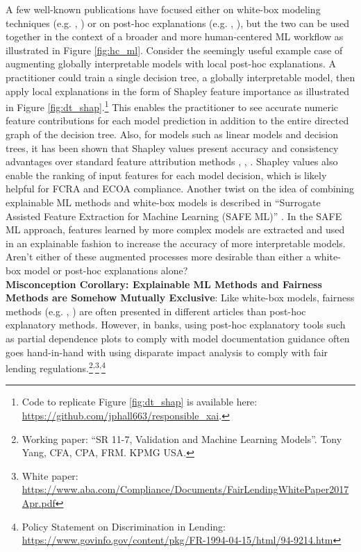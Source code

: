 \documentclass[fleqn]{article}
\begin{document}
A few well-known publications have focused either on white-box modeling techniques (e.g. \cite{slim}, \cite{sbrl}) or on post-hoc explanations (e.g.  \cite{shapley}, \cite{lime}), but the two can be used together in the context of a broader and more human-centered ML workflow as illustrated in Figure \ref{fig:hc_ml}. Consider the seemingly useful example case of augmenting globally interpretable models with local post-hoc explanations. A practitioner could train a single decision tree, a globally interpretable model, then apply local explanations in the form of Shapley feature importance as illustrated in Figure \ref{fig:dt_shap}.\footnote{Code to replicate Figure \ref{fig:dt_shap} is available here: \url{https://github.com/jphall663/responsible_xai}.} This enables the practitioner to see accurate numeric feature contributions for each model prediction in addition to the entire directed graph of the decision tree. Also, for models such as linear models and decision trees, it has been shown that Shapley values present accuracy and consistency advantages over standard feature attribution methods \cite{lipovetsky2001analysis}, \cite{tree_shap}, \cite{shapley}. Shapley values also enable the ranking of input features for each model decision, which is likely helpful for FCRA and ECOA compliance. Another twist on the idea of combining explainable ML methods and white-box models is described in ``Surrogate Assisted Feature Extraction for Machine Learning (SAFE ML)'' \cite{gosiewska2019safe}. In the SAFE ML approach, features learned by more complex models are extracted and used in an explainable fashion to increase the accuracy of more interpretable models. Aren't either of these augmented processes more desirable than either a white-box model or post-hoc explanations alone?\\ 

\noindent\textbf{Misconception Corollary: Explainable ML Methods and Fairness Methods are Somehow Mutually Exclusive}: Like white-box models, fairness methods (e.g. \cite{feldman2015certifying}, \cite{hardt2016equality}) are often presented in different articles than post-hoc explanatory methods. However, in banks, using post-hoc explanatory tools such as partial dependence plots to comply with model documentation guidance often goes hand-in-hand with using disparate impact analysis to comply with fair lending regulations.\footnote{Working paper: “SR 11-7, Validation and Machine Learning Models”. Tony Yang, CFA, CPA, FRM. KPMG USA.}\textsuperscript{,}\footnote{White paper: \url{https://www.aba.com/Compliance/Documents/FairLendingWhitePaper2017Apr.pdf}}\textsuperscript{,}\footnote{Policy Statement on Discrimination in Lending: \url{https://www.govinfo.gov/content/pkg/FR-1994-04-15/html/94-9214.htm}} 
\end{document}
